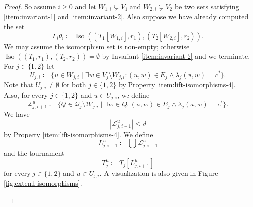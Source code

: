 \PassOptionsToPackage{dvipsnames,svgnames}{xcolor}\documentclass[10pt,a4paper]{article}
\newcommand{\CL}{{\mathcal L}}
\newcommand{\CQ}{{\mathcal Q}}
\newcommand{\CW}{{\mathcal W}}
\DeclareMathOperator{\Iso}{Iso}
\begin{document}
\begin{proof}
 So assume $i \geq 0$ and let $W_{1,i} \subsetneq V_1$ and $W_{2,i} \subsetneq V_2$ be two sets satisfying \ref{item:invariant-1} and \ref{item:invariant-2}.
 Also suppose we have already computed the set
 \begin{equation}
  \label{eq:def-gamma-i}
  \Gamma_i\theta_i \coloneqq \Iso((T_1[W_{1,i}],r_1),(T_2[W_{2,i}],r_2)).
 \end{equation}
 We may assume the isomorphism set is non-empty; otherwise $\Iso((T_1,r_1),(T_2,r_2)) = \emptyset$ by Invariant \ref{item:invariant-2} and we terminate.
 For $j \in \{1,2\}$ let
 \[U_{j,i} \coloneqq \{u \in W_{j,i} \mid \exists w \in V_j \setminus W_{j,i} \colon (u,w) \in E_j \wedge \lambda_j(u,w) = c^*\}.\]
 Note that $U_{j,i} \neq \emptyset$ for both $j \in \{1,2\}$ by Property \ref{item:lift-isomorphisms-4}.
 Also, for every $j \in \{1,2\}$ and $u \in U_{j,i}$, we define
 \[\CL_{j,i+1}^{u} \coloneqq \{Q \in \CQ_j \setminus \CW_{j,i} \mid \exists w \in Q \colon (u,w) \in E_j \wedge \lambda_j(u,w) = c^*\}.\]
 We have
 \[|\CL_{j,i+1}^{u}| \leq d\]
 by Property \ref{item:lift-isomorphisms-4}.
 We define
 \[L_{j,i+1}^{u} \coloneqq \bigcup \CL_{j,i+1}^{u}\]
 and the tournament
 \[T_j^u \coloneqq T_j[L_{j,i+1}^{u}]\]
 for every $j \in \{1,2\}$ and $u \in U_{j,i}$.
 A visualization is also given in Figure \ref{fig:extend-isomorphisms}.

 \begin{figure}
  \centering
\end{figure}
\end{proof}
\end{document}

